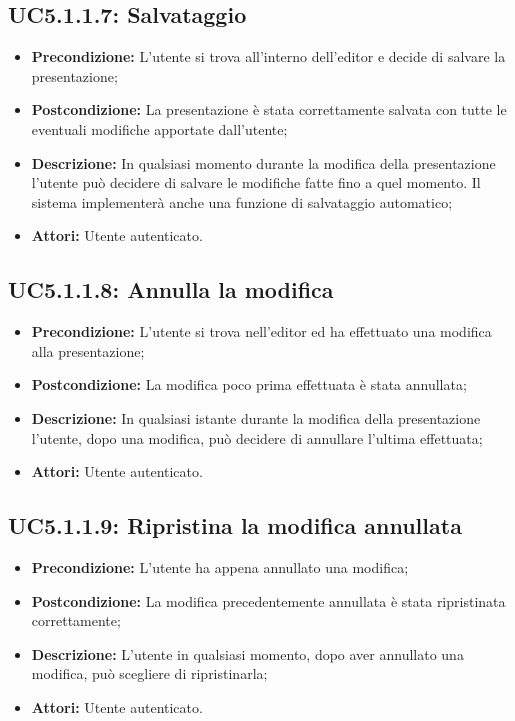 \subsection{ UC5.1.1.7: Salvataggio}

\begin{itemize}
	\item \textbf{Precondizione:} L’utente si trova all’interno dell’editor e decide di salvare la presentazione;
	\item \textbf{Postcondizione:} La presentazione è stata correttamente salvata con tutte le eventuali modifiche apportate dall’utente;
	\item \textbf{Descrizione:} In qualsiasi momento durante la modifica della presentazione l’utente può decidere di salvare le modifiche fatte fino a quel momento. Il sistema implementerà anche una funzione di salvataggio automatico;
	\item \textbf{Attori:} Utente autenticato.
\end{itemize}
\subsection{ UC5.1.1.8: Annulla la modifica}

\begin{itemize}
	\item \textbf{Precondizione:} L’utente si trova nell’editor ed ha effettuato una modifica alla presentazione;
	\item \textbf{Postcondizione:} La modifica poco prima effettuata è stata annullata;
	\item \textbf{Descrizione:} In qualsiasi istante durante la modifica della presentazione l’utente, dopo una modifica, può decidere di annullare l’ultima effettuata;
	\item \textbf{Attori:} Utente autenticato.
\end{itemize}
\subsection{ UC5.1.1.9: Ripristina la modifica annullata}

\begin{itemize}
	\item \textbf{Precondizione:} L’utente ha appena annullato una modifica;
	\item \textbf{Postcondizione:} La modifica precedentemente annullata è stata ripristinata correttamente;
	\item \textbf{Descrizione:} L’utente in qualsiasi momento, dopo aver annullato una modifica, può scegliere di ripristinarla;
	\item \textbf{Attori:} Utente autenticato.
\end{itemize}
